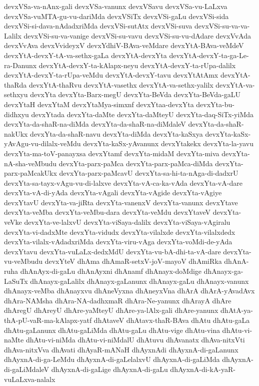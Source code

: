{devxVSa-va-nAnx-gali
devxVSa-vanunx
devxVSavu
devxVSa-vu-LaLxva
devxVSa-vuMTA-gu-vu-dariMda
devxVSiTx
devxVSi-gaLu
devxVSi-sida
devxVSi-si-dava-nAdadxriMda
devxVSi-sutAtx
devxVSi-suva
devxVSi-su-va-va-Lalilx
devxVSi-su-va-vanige
devxVSi-su-vavu
devxVSi-su-vu-dAdare
devxVvAda
devxVvAva
devxVvideyxV
devxYdhiV-BAva-veMdare
devxYtA-BAva-veMdeV
devxYtA-devxY-tA-va-sethx-gaLa
devxYtA-devxYta
devxYtA-devxY-ta-ga-Le-ra-Danunx
devxYtA-devxY-ta-kAlapx-neyu
devxYtA-devxY-ta-rUpa-dalilx
devxYtA-devxY-ta-rUpa-veMdu
devxYtA-devxY-tavu
devxYtAtAmx
devxYtA-thaRda
devxYtA-thaRvu
devxYtA-vasethx
devxYtA-va-sethx-yalilx
devxYtA-va-sethxyu
devxYta
devxYta-Barx-megU
devxYta-BeVda
devxYta-BeVda-gaLU
devxYtaH
devxYtaM
devxYtaMya-simxnf
devxYtaa-devxYta
devxYta-bu-didhxyu
devxYtada
devxYta-daMte
devxYta-daMteyU
devxYta-daq-SiTx-yiMda
devxYta-da-shaR-na-diMda
devxYta-da-shaR-na-diMdaleV
devxYta-da-shaR-nakUkx
devxYta-da-shaR-navu
devxYta-diMda
devxYta-kaSxya
devxYta-kaSx-yAvAgu-vu-dilalx-veMdu
devxYta-kaSx-yAvanunx
devxYtakekx
devxYta-la-yavu
devxYta-ma-toV-panayxsa
devxYtamf
devxYta-midaM
devxYta-miva
devxYta-nA-sha-veMbudu
devxYta-parx-paMca
devxYta-parx-paMca-diMda
devxYta-parx-paMcakUkx
devxYta-parx-paMcavU
devxYta-sa-hi-ta-nAga-di-dadxrU
devxYta-sa-tayx-vAgu-vu-di-lalxve
devxYta-vA-ca-ka-vAda
devxYta-vA-dare
devxYta-vA-di-yAda
devxYta-vAgali
devxYta-vAgide
devxYta-vAgiye
devxYtavU
devxYta-va-jiRta
devxYta-vanenxV
devxYta-vanunx
devxYtave
devxYta-veMba
devxYta-veMbu-dara
devxYta-veMdu
devxYtaveV
devxYta-veVke
devxYta-ve-lalxvU
devxYta-viSaya-dalilx
devxYta-viSaya-vAgiralu
devxYta-vi-dadxMte
devxYta-vidudx
devxYta-vilalxde
devxYta-vilalxdedx
devxYta-vilalx-vAdadxriMda
devxYta-viru-vAga
devxYta-voMdi-de-yAda
devxYtavu
devxYta-vuLaLx-dedxMdU
devxYta-vu-bA-dhi-ta-vA-dare
devxYta-vu-veMbudu
devxYteV
dhAma
dhAmaR-setxV-joV-mayoV
dhAmiRka
dhAnA-ruha
dhAnAyx-di-gaLu
dhAnAyxni
dhAnamf
dhAnayx-doMdige
dhAnayx-ga-LaSuTx
dhAnayx-gaLalilx
dhAnayx-gaLanunx
dhAnayx-gaLu
dhAnayx-vanunx
dhAnayx-veMba
dhAnayxvu
dhAneVyxna
dhAneyxVna
dhArA
dhArA-yAvadAvx
dhAra-NAMsha
dhAra-NA-dadhxmaR
dhAra-Ne-yanunx
dhArayA
dhAre
dhAregU
dhAreyU
dhAre-yaMteyU
dhAre-ya-lAlx-gali
dhAre-yanunx
dhAtA-ya-thA-pU-vaR-ma-kAlapx-yatf
dhAtaveV
dhAtavx-thaR-BAva
dhAtu
dhAtu-gaLa
dhAtu-gaLanunx
dhAtu-gaLiMda
dhAtu-gaLu
dhAtu-vige
dhAtu-vina
dhAtu-vi-naMte
dhAtu-vi-niMda
dhAtu-vi-niMdalU
dhAtuvu
dhAvanatx
dhAva-nitxVti
dhAva-nitxVva
dhAvati
dhAyaR-mANaH
dhAyxnAdi
dhAyxnA-di-gaLanunx
dhAyxnA-di-ga-LeMdu
dhAyxnA-di-gaLelalxvU
dhAyxnA-di-gaLiMda
dhAyxnA-di-gaLiMdaleV
dhAyxnA-di-gaLige
dhAyxnA-di-gaLu
dhAyxnA-di-kA-yaR-vuLaLxva-nalalx
}

